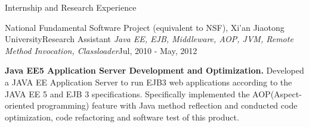 \documentclass{professional} %
\begin{document}
\begin{rSection}{Internship and Research Experience}
\begin{rSubsection}{National Fundamental Software Project (equivalent to NSF), Xi'an Jiaotong University}{Research Assistant}
{\it Java EE, EJB, Middleware, AOP, JVM, Remote Method Invocation, Classloader}{Jul, 2010 - May, 2012}
\item {\bf Java EE5 Application Server Development and Optimization.}
Developed a JAVA EE Application Server to run EJB3 web applications according to the JAVA EE 5 and EJB 3 specifications. Specifically implemented the AOP(Aspect-oriented programming) feature with Java method reflection and conducted code optimization, code refactoring and software test of this product.
\end{rSubsection} 



\end{rSection}
\end{document}
